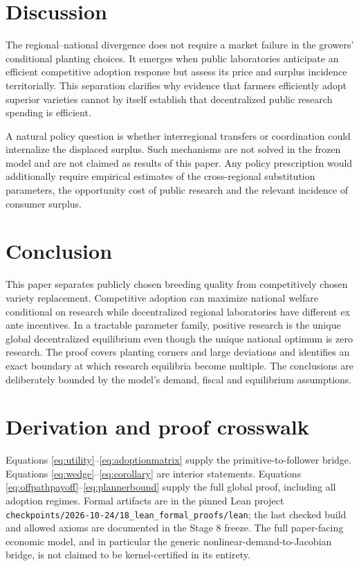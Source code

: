 \documentclass[11pt,a4paper]{article}
\begin{document}
\section{Discussion}
The regional--national divergence does not require a market failure in the growers' conditional planting choices. It emerges when public laboratories anticipate an efficient competitive adoption response but assess its price and surplus incidence territorially. This separation clarifies why evidence that farmers efficiently adopt superior varieties cannot by itself establish that decentralized public research spending is efficient.

A natural policy question is whether interregional transfers or coordination could internalize the displaced surplus. Such mechanisms are not solved in the frozen model and are not claimed as results of this paper. Any policy prescription would additionally require empirical estimates of the cross-regional substitution parameters, the opportunity cost of public research and the relevant incidence of consumer surplus.

\section{Conclusion}
This paper separates publicly chosen breeding quality from competitively chosen variety replacement. Competitive adoption can maximize national welfare conditional on research while decentralized regional laboratories have different ex ante incentives. In a tractable parameter family, positive research is the unique global decentralized equilibrium even though the unique national optimum is zero research. The proof covers planting corners and large deviations and identifies an exact boundary at which research equilibria become multiple. The conclusions are deliberately bounded by the model's demand, fiscal and equilibrium assumptions.

\appendix
\section{Derivation and proof crosswalk}
Equations \eqref{eq:utility}--\eqref{eq:adoptionmatrix} supply the primitive-to-follower bridge. Equations \eqref{eq:wedge}--\eqref{eq:corollary} are interior statements. Equations \eqref{eq:offpathpayoff}--\eqref{eq:plannerbound} supply the full global proof, including all adoption regimes. Formal artifacts are in the pinned Lean project \texttt{checkpoints/2026-10-24/18\_lean\_formal\_proofs/lean}; the last checked build and allowed axioms are documented in the Stage 8 freeze. The full paper-facing economic model, and in particular the generic nonlinear-demand-to-Jacobian bridge, is not claimed to be kernel-certified in its entirety.
\end{document}
